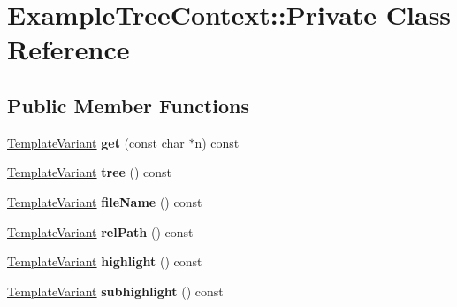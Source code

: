 \hypertarget{class_example_tree_context_1_1_private}{}\section{Example\+Tree\+Context\+::Private Class Reference}
\label{class_example_tree_context_1_1_private}
\subsection*{Public Member Functions}
\begin{DoxyCompactItemize}
\item 
\mbox{\label{class_example_tree_context_1_1_private_a77a6d4638d9f45d7d1bf3bc32959f38d}} 
\mbox{\hyperlink{class_template_variant}{Template\+Variant}} {\bfseries get} (const char $\ast$n) const
\item 
\mbox{\label{class_example_tree_context_1_1_private_a9423cb9475dea45e674b3a2cbf4cdb35}} 
\mbox{\hyperlink{class_template_variant}{Template\+Variant}} {\bfseries tree} () const
\item 
\mbox{\label{class_example_tree_context_1_1_private_a95a779bd224341428247df3156b6bf8e}} 
\mbox{\hyperlink{class_template_variant}{Template\+Variant}} {\bfseries file\+Name} () const
\item 
\mbox{\label{class_example_tree_context_1_1_private_a4f8da9fb53b1cec8382c713ec14a7da0}} 
\mbox{\hyperlink{class_template_variant}{Template\+Variant}} {\bfseries rel\+Path} () const
\item 
\mbox{\label{class_example_tree_context_1_1_private_a38206c35ea4c8328cd23a3cd6e80a5ec}} 
\mbox{\hyperlink{class_template_variant}{Template\+Variant}} {\bfseries highlight} () const
\item 
\mbox{\label{class_example_tree_context_1_1_private_a3b6647f5ec83214d904a6efb8b161e59}} 
\mbox{\hyperlink{class_template_variant}{Template\+Variant}} {\bfseries subhighlight} () const
\item 
\mbox{\label{class_example_tree_context_1_1_private_a8b4c39f4f1b88d9f12fe59adc1f85099}} 

\end{DoxyCompactItemize}
